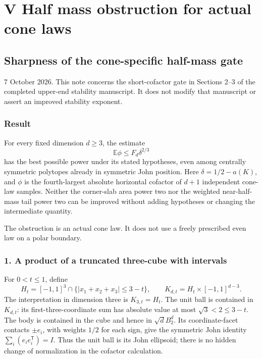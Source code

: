 \documentclass[
  11pt,
]{article}
\begin{document}
\newpage

\section{V Half mass obstruction for actual cone
laws}\label{v-half-mass-obstruction-for-actual-cone-laws}

\subsection{Sharpness of the cone-specific half-mass
gate}\label{sharpness-of-the-cone-specific-half-mass-gate}

7 October 2026. This note concerns the short-cofactor gate in Sections
2--3 of the completed upper-end stability manuscript. It does not modify
that manuscript or assert an improved stability exponent.

\subsubsection{Result}\label{result}

For every fixed dimension \(d\ge3\), the estimate \[
 \mathbb E\phi\le F_d\delta^{2/3}
\] has the best possible power under its stated hypotheses, even among
centrally symmetric polytopes already in symmetric John position. Here
\(\delta=1/2-a(K)\), and \(\phi\) is the fourth-largest absolute
horizontal cofactor of \(d+1\) independent cone-law samples. Neither the
corner-slab area power two nor the weighted near-half-mass tail power
two can be improved without adding hypotheses or changing the
intermediate quantity.

The obstruction is an actual cone law. It does not use a freely
prescribed even law on a polar boundary.

\subsubsection{1. A product of a truncated three-cube with
intervals}\label{a-product-of-a-truncated-three-cube-with-intervals}

For \(0<t\le1\), define \[
 H_t=[-1,1]^3\cap\{|x_1+x_2+x_3|\le3-t\},\qquad
 K_{d,t}=H_t\times[-1,1]^{d-3}.
\] The interpretation in dimension three is \(K_{3,t}=H_t\). The unit
ball is contained in \(K_{d,t}\): its first-three-coordinate sum has
absolute value at most \(\sqrt3<2\le3-t\). The body is contained in the
cube and hence in \(\sqrt d B_2^d\). Its coordinate-facet contacts
\(\pm e_i\), with weights \(1/2\) for each sign, give the symmetric John
identity \(\sum_i(e_ie_i^{\mathsf T})=I\). Thus the unit ball is its
John ellipsoid; there is no hidden change of normalization in the
cofactor calculation.
\end{document}
